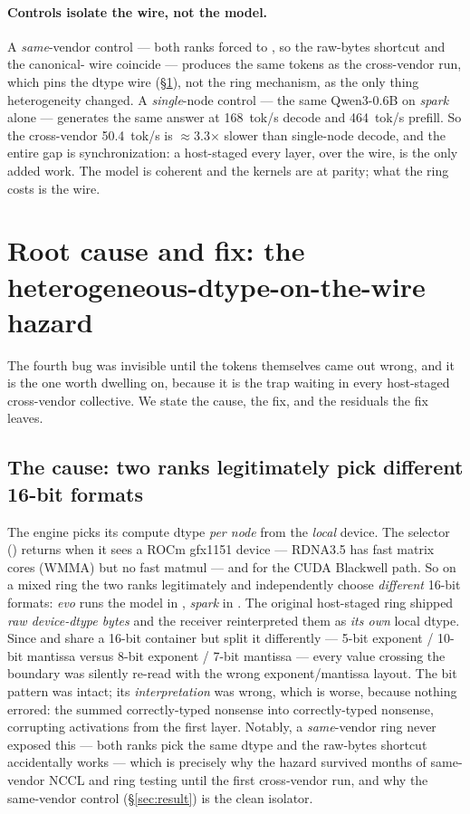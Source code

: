 \documentclass[11pt]{article}
\begin{document}
\paragraph{Controls isolate the wire, not the model.} A \emph{same}-vendor control --- both ranks forced
to , so the raw-bytes shortcut and the canonical- wire coincide --- produces the same
tokens as the cross-vendor run, which pins the dtype wire (\S\ref{sec:rootcause}), not the ring
mechanism, as the only thing heterogeneity changed. A \emph{single}-node control --- the same Qwen3-0.6B
on \emph{spark} alone --- generates the same answer at 168~tok/s decode and 464~tok/s prefill. So the
cross-vendor 50.4~tok/s is $\approx$3.3$\times$ slower than single-node decode, and the entire gap is
synchronization: a host-staged  every layer, over the wire, is the only added work. The
model is coherent and the kernels are at parity; what the ring costs is the wire.

\section{Root cause and fix: the heterogeneous-dtype-on-the-wire hazard}
\label{sec:rootcause}

The fourth bug was invisible until the tokens themselves came out wrong, and it is the one worth dwelling
on, because it is the trap waiting in every host-staged cross-vendor collective. We state the cause, the
fix, and the residuals the fix leaves.

\subsection{The cause: two ranks legitimately pick different 16-bit formats}
\label{sec:dtype}

The engine picks its compute dtype \emph{per node} from the \emph{local} device. The selector
() returns  when it sees a ROCm gfx1151 device --- RDNA3.5 has
fast  matrix cores (WMMA) but no fast  matmul --- and  for the CUDA
Blackwell path. So on a mixed ring the two ranks legitimately and independently choose \emph{different}
16-bit formats: \emph{evo} runs the model in , \emph{spark} in . The original
host-staged ring shipped \emph{raw device-dtype bytes} and the receiver reinterpreted them as \emph{its
own} local dtype. Since  and  share a 16-bit container but split it differently ---
5-bit exponent / 10-bit mantissa versus 8-bit exponent / 7-bit mantissa --- every value crossing the
boundary was silently re-read with the wrong exponent/mantissa layout. The bit pattern was intact; its
\emph{interpretation} was wrong, which is worse, because nothing errored: the  summed
correctly-typed nonsense into correctly-typed nonsense, corrupting activations from the first layer.
Notably, a \emph{same}-vendor ring never exposed this --- both ranks pick the same dtype and the raw-bytes
shortcut accidentally works --- which is precisely why the hazard survived months of same-vendor NCCL and
ring testing until the first cross-vendor run, and why the same-vendor control (\S\ref{sec:result}) is the
clean isolator.
\end{document}

